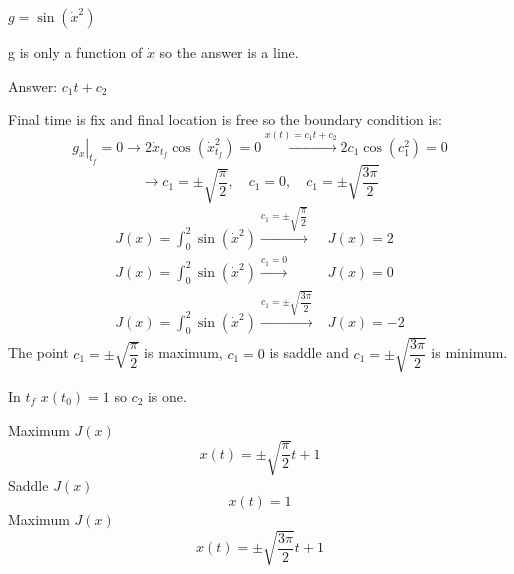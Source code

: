 $g = \sin(\dot x^2)$


g is only a function of $\dot x$ so the answer is a line.



Answer: $c_1t+c_2$


Final time is fix and final location is free so the boundary condition is:
$$ \left.g_{\dot x} \right\vert_{t_f} = 0 \to 2\dot x_{t_f}\cos(\dot x_{t_f}^2) = 0\xrightarrow{x(t) = c_1t+c_2}2c_1\cos(c_1^2) = 0$$
$$\to c_1 = \pm \sqrt{\dfrac{\pi}{2}}, \quad c_1 = 0 ,\quad c_1 = \pm \sqrt{\dfrac{3\pi}{2}}$$
\begin{align*}
J(x) = \int_0^2 \sin(\dot x^2)  \xrightarrow{c_1 =\pm  \sqrt{\dfrac{\pi}{2}}}  &J(x) = 2\\
J(x) = \int_0^2 \sin(\dot x^2)  \xrightarrow{c_1 = 0 } &J(x) = 0\\
J(x) = \int_0^2 \sin(\dot x^2)  \xrightarrow{c_1 =\pm  \sqrt{\dfrac{3\pi}{2}}}  &J(x) = -2
\end{align*}
The point $c_1 =\pm  \sqrt{\dfrac{\pi}{2}} $ is maximum, $c_1 =0$ is saddle and $c_1 =\pm  \sqrt{\dfrac{3\pi}{2}} $ is minimum.
﻿﻿


In $t_f$ $x(t_0) = 1$ so $c_2$ is one.


Maximum $J(x)$
$$x(t) = \pm \sqrt{\dfrac{\pi}{2}}t + 1$$
Saddle $J(x)$
$$x(t) = 1$$
Maximum $J(x)$
$$x(t) = \pm \sqrt{\dfrac{3\pi}{2}}t + 1$$